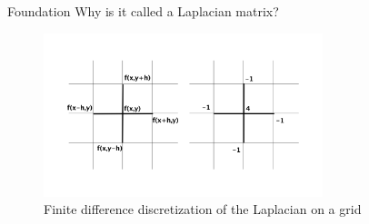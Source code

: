 \documentclass[xcolor=dvipsnames,10pt]{beamer}
\begin{document}
\begin{frame}{Foundation}
\vspace{.3in}
Why is it called a Laplacian matrix?

\begin{figure}
\begin{center}
\includegraphics[width=3.2in]{laplace.png}
\caption{Finite difference discretization of the Laplacian on a grid}
\end{center}
\end{figure}


\end{frame}

\end{document}
